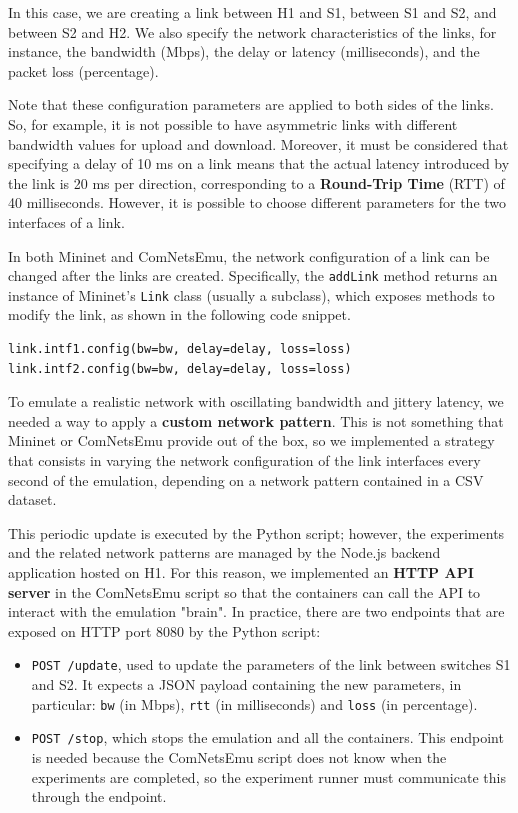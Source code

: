 In this case, we are creating a link between H1 and S1, between S1 and S2, and between S2 and H2. We also specify the network characteristics of the links, for instance, the bandwidth (Mbps), the delay or latency (milliseconds), and the packet loss (percentage).

Note that these configuration parameters are applied to both sides of the links. So, for example, it is not possible to have asymmetric links with different bandwidth values for upload and download. Moreover, it must be considered that specifying a delay of 10 ms on a link means that the actual latency introduced by the link is 20 ms per direction, corresponding to a \textbf{Round-Trip Time} (RTT) of 40 milliseconds. However, it is possible to choose different parameters for the two interfaces of a link.

In both Mininet and ComNetsEmu, the network configuration of a link can be changed after the links are created. Specifically, the \texttt{addLink} method returns an instance of Mininet's \texttt{Link} class (usually a subclass), which exposes methods to modify the link, as shown in the following code snippet.

\begin{verbatim}
link.intf1.config(bw=bw, delay=delay, loss=loss)
link.intf2.config(bw=bw, delay=delay, loss=loss)
\end{verbatim}

To emulate a realistic network with oscillating bandwidth and jittery latency, we needed a way to apply a \textbf{custom network pattern}. This is not something that Mininet or ComNetsEmu provide out of the box, so we implemented a strategy that consists in varying the network configuration of the link interfaces every second of the emulation, depending on a network pattern contained in a CSV dataset.

This periodic update is executed by the Python script; however, the experiments and the related network patterns are managed by the Node.js backend application hosted on H1. For this reason, we implemented an \textbf{HTTP API server} in the ComNetsEmu script so that the containers can call the API to interact with the emulation "brain". In practice, there are two endpoints that are exposed on HTTP port 8080 by the Python script:

\begin{itemize}
    \item \texttt{POST /update}, used to update the parameters of the link between switches S1 and S2. It expects a JSON payload containing the new parameters, in particular: \texttt{bw} (in Mbps), \texttt{rtt} (in milliseconds) and \texttt{loss} (in percentage).
    \item \texttt{POST /stop}, which stops the emulation and all the containers. This endpoint is needed because the ComNetsEmu script does not know when the experiments are completed, so the experiment runner must communicate this through the endpoint.
\end{itemize}

